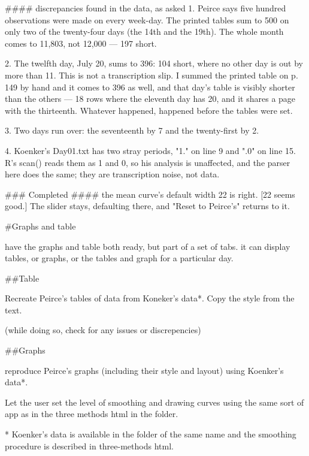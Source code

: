 #### discrepancies found in the data, as asked
1. Peirce says five hundred observations were made on every week-day. The
   printed tables sum to 500 on only two of the twenty-four days (the 14th and
   the 19th). The whole month comes to 11,803, not 12,000 — 197 short.

2. The twelfth day, July 20, sums to 396: 104 short, where no other day is out
   by more than 11. This is not a transcription slip. I summed the printed table
   on p. 149 by hand and it comes to 396 as well, and that day's table is
   visibly shorter than the others — 18 rows where the eleventh day has 20, and
   it shares a page with the thirteenth. Whatever happened, happened before the
   tables were set.

3. Two days run over: the seventeenth by 7 and the twenty-first by 2.

4. Koenker's Day01.txt has two stray periods, "1." on line 9 and ".0" on line
   15. R's scan() reads them as 1 and 0, so his analysis is unaffected, and the
   parser here does the same; they are transcription noise, not data.

### Completed
#### the mean curve's default width
22 is right. [22 seems good.] The slider stays, defaulting there, and "Reset to
Peirce's" returns to it.

#Graphs and table

have the graphs and table both ready, but part of a set of tabs. it can display tables, or graphs, or the tables and graph for a particular day. 

##Table

Recreate Peirce's tables of data from Koneker's data*.  Copy the style from the text. 

(while doing so, check for any issues or discrepencies)

##Graphs

reproduce Peirce's graphs (including their style and layout) using Koenker's data*.
 
 Let the user set the level of smoothing and drawing curves using the same sort of app as in the three methods html in the folder. 
 


* Koenker's data is available in the folder of the same name and the smoothing procedure is described in three-methods html. 